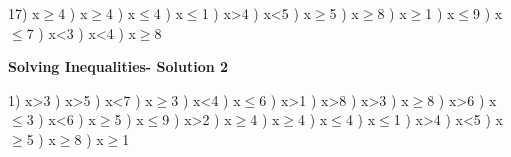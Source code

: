 \documentclass{article}%
\begin{document}
17) x$\geq$4%
) x$\geq$4%
) x$\leq$4%
) x$\leq$1%
) x>4%
) x<5%
) x$\geq$5%
) x$\geq$8%
) x$\geq$1%
) x$\leq$9%
) x$\leq$7%
) x<3%
) x<4%
) x$\geq$8%
\newline%
\newpage%
\large%
\begin{center}%
\textbf{Solving Inequalities- Solution 2}%
\newline%
\end{center} \normalsize%
1) x>3%
) x>5%
) x<7%
) x$\geq$3%
) x<4%
) x$\leq$6%
) x>1%
) x>8%
) x>3%
) x$\geq$8%
) x>6%
) x$\leq$3%
) x<6%
) x$\geq$5%
) x$\leq$9%
) x>2%
) x$\geq$4%
) x$\geq$4%
) x$\leq$4%
) x$\leq$1%
) x>4%
) x<5%
) x$\geq$5%
) x$\geq$8%
) x$\geq$1%
\newline%
\end{document}
